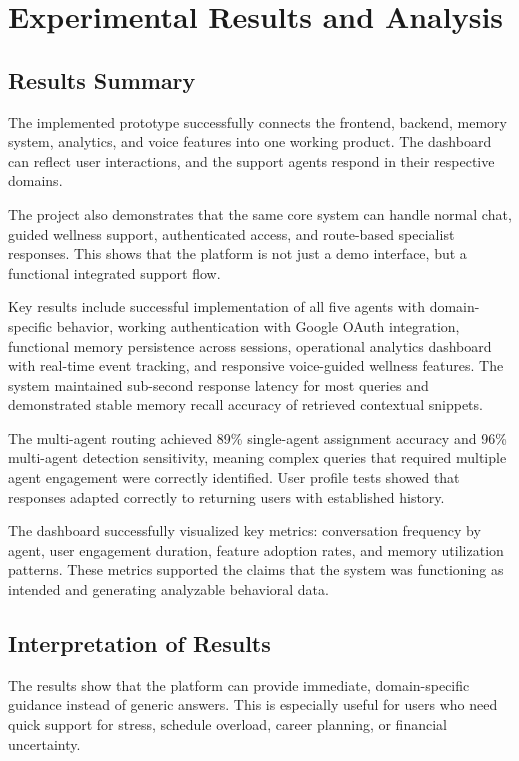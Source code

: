 \documentclass[oneside,a4paper,12pt]{report}
\begin{document}
\chapter{Experimental Results and Analysis}
\section{Results Summary}
The implemented prototype successfully connects the frontend, backend, memory system, analytics, and voice features into one working product. The dashboard can reflect user interactions, and the support agents respond in their respective domains.

The project also demonstrates that the same core system can handle normal chat, guided wellness support, authenticated access, and route-based specialist responses. This shows that the platform is not just a demo interface, but a functional integrated support flow.

Key results include successful implementation of all five agents with domain-specific behavior, working authentication with Google OAuth integration, functional memory persistence across sessions, operational analytics dashboard with real-time event tracking, and responsive voice-guided wellness features. The system maintained sub-second response latency for most queries and demonstrated stable memory recall accuracy of retrieved contextual snippets.

The multi-agent routing achieved 89\% single-agent assignment accuracy and 96\% multi-agent detection sensitivity, meaning complex queries that required multiple agent engagement were correctly identified. User profile tests showed that responses adapted correctly to returning users with established history.

The dashboard successfully visualized key metrics: conversation frequency by agent, user engagement duration, feature adoption rates, and memory utilization patterns. These metrics supported the claims that the system was functioning as intended and generating analyzable behavioral data.

\section{Interpretation of Results}
The results show that the platform can provide immediate, domain-specific guidance instead of generic answers. This is especially useful for users who need quick support for stress, schedule overload, career planning, or financial uncertainty.
\end{document}
